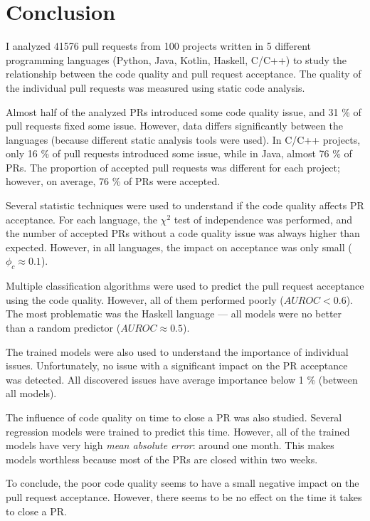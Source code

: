 \documentclass[digital,oneside,oldtable,nolof,nolot,nocover]{fithesis4}
\begin{document}
\chapter{Conclusion}
\label{sec:org979254a}
I analyzed 41576 pull requests from 100 projects written in 5 different
programming languages (Python, Java, Kotlin, Haskell, C/C++) to study the
relationship between the code quality and pull request acceptance.  The
quality of the individual pull requests was measured using static code
analysis.

Almost half of the analyzed PRs introduced some code quality issue, and 31 \%
of pull requests fixed some issue. However, data differs significantly between
the languages (because different static analysis tools were used).  In C/C++
projects, only 16 \% of pull requests introduced some issue, while in Java,
almost 76 \% of PRs. The proportion of accepted pull requests was different for
each project; however, on average, 76 \% of PRs were accepted.

Several statistic techniques were used to understand if the code quality
affects PR acceptance. For each language, the \(\chi^2\) test of independence
was performed, and the number of accepted PRs without a code quality issue was always
higher than expected. However, in all languages, the impact on acceptance was
only small (\(\phi_c \approx 0.1\)).

Multiple classification algorithms were used to predict the pull request acceptance
using the code quality. However, all of them performed poorly (\(AUROC < 0.6\)).
The most problematic was the Haskell language --- all models were no better than a random
predictor (\(AUROC \approx 0.5\)).

The trained models were also used to understand the importance of individual issues.
Unfortunately, no issue with a significant impact on the PR acceptance was detected.
All discovered issues have average importance below 1 \% (between all models).

The influence of code quality on time to close a PR was also
studied. Several regression models were trained to predict this time. However,
all of the trained models have very high \emph{mean absolute error}: around one month.
This makes models worthless because most of the PRs are closed within two
weeks.

To conclude, the poor code quality seems to have a small negative impact on the
pull request acceptance. However, there seems to be no effect on the time it
takes to close a PR.
\end{document}
